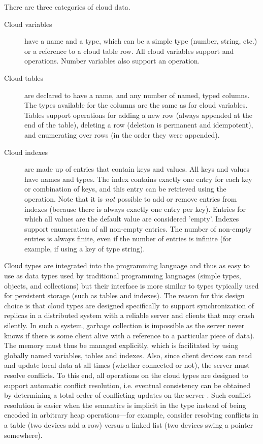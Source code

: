 \documentclass[preprint]{sigplanconf}
\begin{document}
There are three categories of cloud data.
\begin{description}
\item[Cloud variables] have a name and a type, which can be a simple type (number, string, etc.) or a reference to a cloud table row. All cloud variables support  and  operations. Number variables also support an  operation.
\item[Cloud tables]  are declared to have a name, and any number of named, typed columns.  The types available for the columns  are the same as for cloud variables. Tables support operations for adding a new row (always appended at the end of the table), deleting a row (deletion is permanent and idempotent), and enumerating over rows (in the order they were appended). 
\item[Cloud indexes] are made up of entries that contain keys and values. All keys and values have names and types. The index contains exactly one entry for each key or combination of keys, and this entry can be retrieved using the  operation. Note that it is \emph{not} possible to add or remove entries from indexes (because there is always exactly one entry per key). Entries for which all values are the default value are considered 'empty'. Indexes support enumeration of all non-empty entries. The number of non-empty entries is always finite, even if the number of entries is infinite (for example, if using a key of type string).
\end{description}

Cloud types are integrated into the programming language and thus as easy to
use as data types used by traditional programming languages (simple types,
objects, and collections) but their interface is more similar to types
typically used for persistent storage (such as tables and
indexes).
The reason for this design choice is that cloud types are designed specifically to
support synchronization of replicas in a distributed system with a reliable
server and clients that may crash silently. 
In such a system, garbage collection is impossible as the server never knows if
there is some client alive with a reference to a particular piece of data).
The memory must thus be managed explicitly, which is
facilitated by using globally named variables, tables and indexes. 
Also, since client devices can read and update local data at all times (whether
connected or not), the server must resolve conflicts.
To this end, all operations on the
cloud types are designed to support automatic conflict resolution, i.e.
eventual consistency can be obtained by determining a total order of
conflicting updates on the server
\cite{burckhardt2012cloud,terry-et-al-SIGOPS95}. 
Such conflict resolution is easier when the semantics is implicit in the type
instead of being encoded in arbitrary heap operations---for example, consider
resolving conflicts in a table (two devices add a row) versus a linked list
(two devices swing a pointer somewhere).
\end{document}
